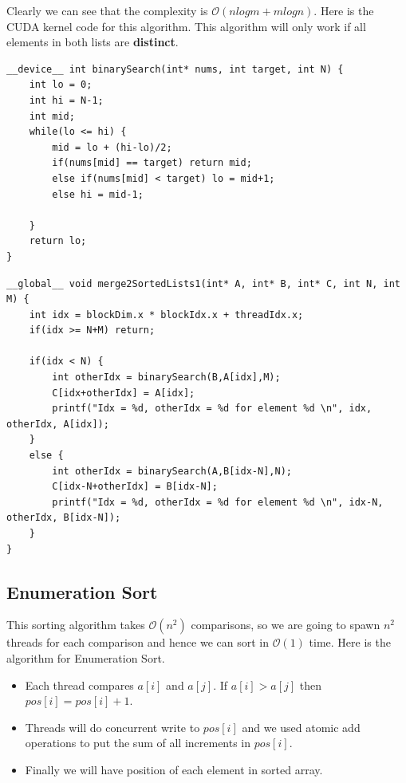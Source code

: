 \documentclass{article}
\begin{document}
Clearly we can see that the complexity is $\mathcal{O}(nlogm + mlogn)$. Here is the CUDA kernel code for this algorithm. This algorithm will only work if all elements in both lists are \textbf{distinct}.


\begin{lstlisting}
__device__ int binarySearch(int* nums, int target, int N) {
    int lo = 0;
    int hi = N-1;
    int mid;
    while(lo <= hi) {
        mid = lo + (hi-lo)/2;
        if(nums[mid] == target) return mid;
        else if(nums[mid] < target) lo = mid+1;
        else hi = mid-1;

    }
    return lo;
}
\end{lstlisting}


\begin{lstlisting}
__global__ void merge2SortedLists1(int* A, int* B, int* C, int N, int M) {
    int idx = blockDim.x * blockIdx.x + threadIdx.x;
    if(idx >= N+M) return;

    if(idx < N) {
        int otherIdx = binarySearch(B,A[idx],M);
        C[idx+otherIdx] = A[idx];
        printf("Idx = %d, otherIdx = %d for element %d \n", idx, otherIdx, A[idx]);
    }
    else {
        int otherIdx = binarySearch(A,B[idx-N],N);
        C[idx-N+otherIdx] = B[idx-N];
        printf("Idx = %d, otherIdx = %d for element %d \n", idx-N, otherIdx, B[idx-N]);
    }
}
\end{lstlisting}

\subsection*{Enumeration Sort}
This sorting algorithm takes $\mathcal{O}(n^2)$ comparisons, so we are going to spawn $n^2$ threads for each comparison and hence we can sort in $\mathcal{O}(1)$ time. Here is the algorithm for Enumeration Sort.

\begin{itemize}
    \item Each thread compares $a[i]$ and $a[j]$. If $a[i] > a[j]$ then $pos[i] = pos[i] + 1$.
    \item Threads will do concurrent write to $pos[i]$ and we used atomic add operations to put the sum of all increments in $pos[i]$.
    \item Finally we will have position of each element in sorted array.
\end{itemize}
\end{document}
